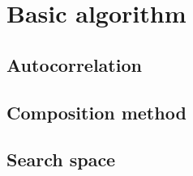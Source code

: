 \chapter{Basic algorithm}
  \section{Autocorrelation}
  \section{Composition method}
  \section{Search space}
